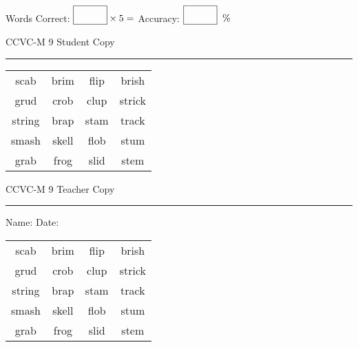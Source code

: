 \documentclass{memoir}
\begin{document}
\small

Words Correct: $\fbox{\phantom{\huge 100}} \times 5 = $ Accuracy: $\fbox{\phantom{\huge 100}}\;\; \%$ 

\vfill

\newpage


\footnotesize \noindent
CCVC-M 9 \hfill Student Copy
\smallskip
\hrule

\Large

\setlength{\tabcolsep}{14pt}
\def\arraystretch{3}

{\selectfont


\begin{vplace}[0.5]
\begin{center}
\begin{tabular}{cccc}
scab & brim      & flip & brish \\
grud & crob & clup & strick \\
string & brap               & stam            & track       \\
smash & skell & flob             & stum \\
grab                    & frog & slid & stem \\
\end{tabular}
\end{center}
\end{vplace}

}

\newpage

\footnotesize \noindent
CCVC-M 9 \hfill Teacher Copy
\smallskip
\hrule

\small

\vfill

\noindent
Name: \underline{\hspace{1.75in}} \hfill Date: \underline{\hspace{1in}}

\Large

{\selectfont


\begin{vplace}[0.5]
\begin{center}
\begin{tabular}{cccc}
scab & brim      & flip & brish \\
grud & crob & clup & strick \\
string & brap               & stam            & track       \\
smash & skell & flob             & stum \\
grab                    & frog & slid & stem \\
\end{tabular}
\end{center}
\end{vplace}



}
\end{document}
